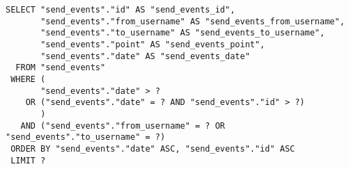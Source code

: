 \documentclass[../../../../main]{subfiles}
\begin{document}
    \begin{mdframed}
        \begin{verbatim}
SELECT "send_events"."id" AS "send_events_id",
       "send_events"."from_username" AS "send_events_from_username",
       "send_events"."to_username" AS "send_events_to_username",
       "send_events"."point" AS "send_events_point",
       "send_events"."date" AS "send_events_date"
  FROM "send_events"
 WHERE (
       "send_events"."date" > ?
    OR ("send_events"."date" = ? AND "send_events"."id" > ?)
       )
   AND ("send_events"."from_username" = ? OR "send_events"."to_username" = ?)
 ORDER BY "send_events"."date" ASC, "send_events"."id" ASC
 LIMIT ?
        \end{verbatim}
    \end{mdframed}
    \label{fig:paging-last-sql}
\end{document}
